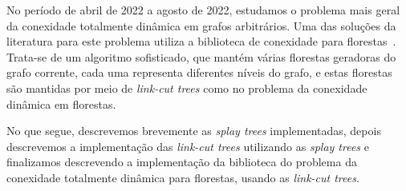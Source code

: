 {\color{red}No período de abril de 2022 a agosto de 2022, estudamos o problema mais geral da conexidade totalmente dinâmica em grafos arbitrários.   Uma das soluções da literatura para este problema utiliza a biblioteca de conexidade para florestas~\cite{HolmLT2001}. Trata-se de um algoritmo sofisticado, que mantém várias florestas geradoras do grafo corrente, cada uma representa diferentes níveis do grafo, e estas florestas são mantidas por meio de \emph{link-cut trees} como no problema da conexidade dinâmica em florestas.}

No que segue, descrevemos brevemente as \emph{splay trees} implementadas, depois descrevemos a implementação das \emph{link-cut trees} 
utilizando as \emph{splay trees} e finalizamos descrevendo a implementação da biblioteca do problema da conexidade totalmente dinâmica para florestas, usando as \emph{link-cut trees}.
